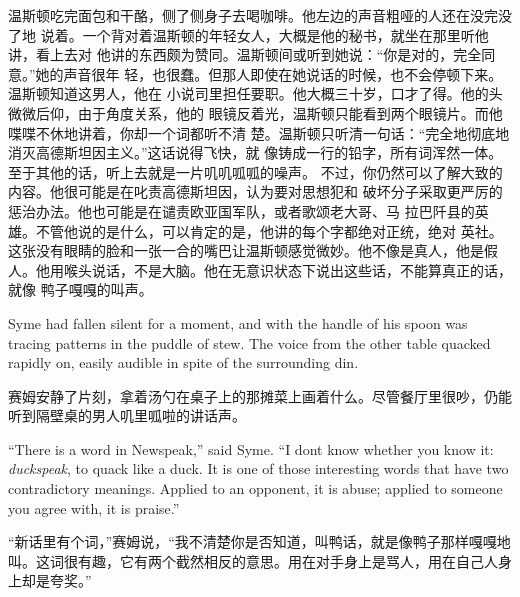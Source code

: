 \begin{paracol}{2}
\switchcolumn

温斯顿吃完面包和干酪，侧了侧身子去喝咖啡。他左边的声音粗哑的人还在没完没了地
说着。一个背对着温斯顿的年轻女人，大概是他的秘书，就坐在那里听他讲，看上去对
他讲的东西颇为赞同。温斯顿间或听到她说：``你是对的，完全同意。''她的声音很年
轻，也很蠢。但那人即使在她说话的时候，也不会停顿下来。温斯顿知道这男人，他在
小说司里担任要职。他大概三十岁，口才了得。他的头微微后仰，由于角度关系，他的
眼镜反着光，温斯顿只能看到两个眼镜片。而他喋喋不休地讲着，你却一个词都听不清
楚。温斯顿只听清一句话：``完全地彻底地消灭高德斯坦因主义。''这话说得飞快，就
像铸成一行的铅字，所有词浑然一体。至于其他的话，听上去就是一片叽叽呱呱的噪声。
不过，你仍然可以了解大致的内容。他很可能是在叱责高德斯坦因，认为要对思想犯和
破坏分子采取更严厉的惩治办法。他也可能是在谴责欧亚国军队，或者歌颂老大哥、马
拉巴阡县的英雄。不管他说的是什么，可以肯定的是，他讲的每个字都绝对正统，绝对
英社。这张没有眼睛的脸和一张一合的嘴巴让温斯顿感觉微妙。他不像是真人，他是假
人。他用喉头说话，不是大脑。他在无意识状态下说出这些话，不能算真正的话，就像
鸭子嘎嘎的叫声。

\switchcolumn*

Syme had fallen silent for a moment, and with the handle of his spoon
was tracing patterns in the puddle of stew. The voice from the other
table quacked rapidly on, easily audible in spite of the surrounding
din.

\switchcolumn

赛姆安静了片刻，拿着汤勺在桌子上的那摊菜上画着什么。尽管餐厅里很吵，仍能听到隔壁桌的男人叽里呱啦的讲话声。

\switchcolumn*

``There is a word in Newspeak,'' said Syme. ``I don\textquotesingle t know
whether you know it: \emph{duckspeak}, to quack like a duck. It is one
of those interesting words that have two contradictory meanings. Applied
to an opponent, it is abuse; applied to someone you agree with, it is
praise.''

\switchcolumn

``新话里有个词，''赛姆说，``我不清楚你是否知道，叫鸭话，就是像鸭子那样嘎嘎地叫。这词很有趣，它有两个截然相反的意思。用在对手身上是骂人，用在自己人身上却是夸奖。''

\switchcolumn*


\end{paracol}
